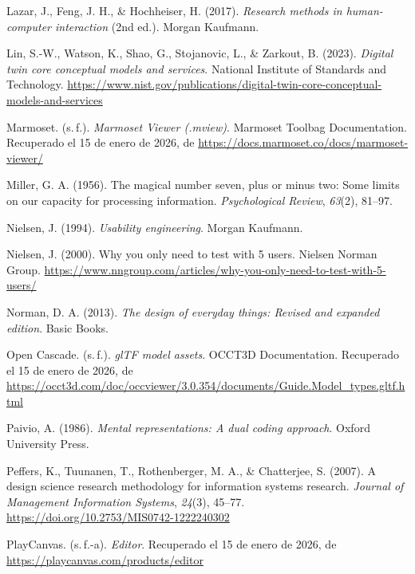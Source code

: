 \begin{list}{}
\item Lazar, J., Feng, J. H., \& Hochheiser, H. (2017). \textit{Research methods in human-computer interaction} (2nd ed.). Morgan Kaufmann.

\item Lin, S.-W., Watson, K., Shao, G., Stojanovic, L., \& Zarkout, B. (2023). \textit{Digital twin core conceptual models and services}. National Institute of Standards and Technology. \url{https://www.nist.gov/publications/digital-twin-core-conceptual-models-and-services}

\item Marmoset. (s.\,f.). \textit{Marmoset Viewer (.mview)}. Marmoset Toolbag Documentation. Recuperado el 15 de enero de 2026, de \url{https://docs.marmoset.co/docs/marmoset-viewer/}

\item Miller, G. A. (1956). The magical number seven, plus or minus two: Some limits on our capacity for processing information. \textit{Psychological Review}, \textit{63}(2), 81--97.

\item Nielsen, J. (1994). \textit{Usability engineering}. Morgan Kaufmann.

\item Nielsen, J. (2000). Why you only need to test with 5 users. Nielsen Norman Group. \url{https://www.nngroup.com/articles/why-you-only-need-to-test-with-5-users/}

\item Norman, D. A. (2013). \textit{The design of everyday things: Revised and expanded edition}. Basic Books.

\item Open Cascade. (s.\,f.). \textit{glTF model assets}. OCCT3D Documentation. Recuperado el 15 de enero de 2026, de \url{https://occt3d.com/doc/occviewer/3.0.354/documents/Guide.Model_types.gltf.html}

\item Paivio, A. (1986). \textit{Mental representations: A dual coding approach}. Oxford University Press.

\item Peffers, K., Tuunanen, T., Rothenberger, M. A., \& Chatterjee, S. (2007). A design science research methodology for information systems research. \textit{Journal of Management Information Systems}, \textit{24}(3), 45--77. \url{https://doi.org/10.2753/MIS0742-1222240302}

\item PlayCanvas. (s.\,f.-a). \textit{Editor}. Recuperado el 15 de enero de 2026, de \url{https://playcanvas.com/products/editor}


\end{list}
